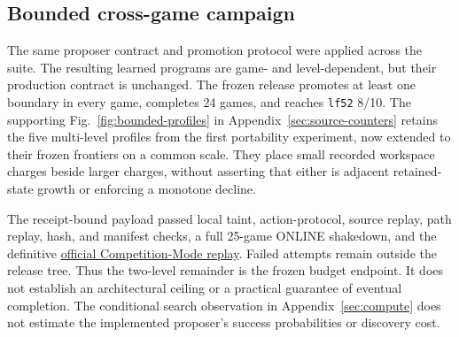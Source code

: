 \documentclass[11pt]{article}
\theoremstyle{definition}
\theoremstyle{remark}
\begin{document}
\subsection{Bounded cross-game campaign}
The same proposer contract and promotion protocol were applied across the suite. The resulting learned
programs are game- and level-dependent, but their production contract is unchanged.
The frozen release promotes at least one boundary in every game, completes 24 games,
and reaches \texttt{lf52} 8/10. The supporting Fig.~\ref{fig:bounded-profiles} in Appendix~\ref{sec:source-counters} retains the five
multi-level profiles from the first portability experiment, now extended to their
frozen frontiers on a common scale. They place small recorded workspace charges
beside larger charges, without asserting that either is adjacent retained-state
growth or enforcing a monotone decline.

The receipt-bound payload passed local taint, action-protocol, source replay, path
replay, hash, and manifest checks, a full 25-game ONLINE shakedown, and the definitive
\href{https://arcprize.org/scorecards/cf75e14b-2c25-41cb-bc70-53bd57411edb}{official
Competition-Mode replay}. Failed attempts remain outside the release tree. Thus the
two-level remainder is the frozen budget endpoint. It does not establish an
architectural ceiling or a practical guarantee of eventual completion. The conditional
search observation in Appendix~\ref{sec:compute} does not estimate the implemented
proposer's success probabilities or discovery cost.
\end{document}
